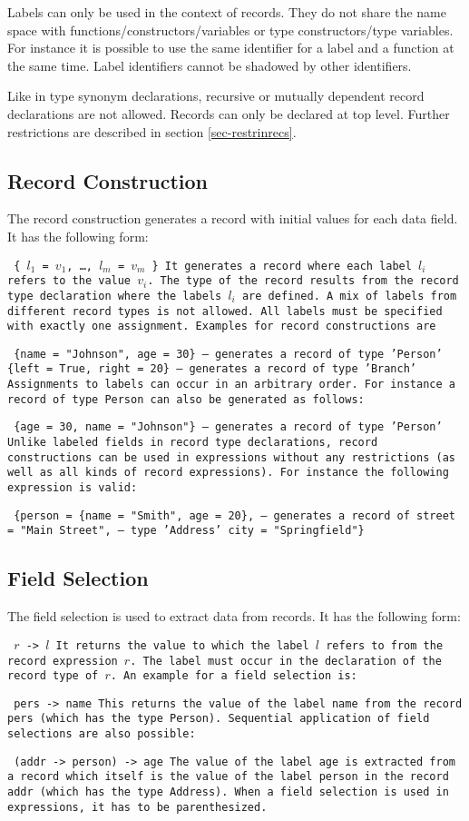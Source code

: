 \documentclass[11pt,fleqn]{article}
\makeatletter
\newenvironment{prog}{\par\vspace{1.5ex}
\setlength{\parindent}{1.0cm}
\setlength{\parskip}{-0.1ex}
\obeylines\@vobeyspaces\tt}{\vspace{1.5ex}\noindent
}
\newcommand{\startprog}{\begin{prog}}
\newcommand{\stopprog}{\end{prog}\noindent}
\newcommand{\pr}[1]{\mbox{\tt #1}}   %
\makeatother
\begin{document}
Labels can only be used in the context of
records. They do not share the name space with 
functions/constructors/variables or type constructors/type variables. 
For instance it is possible to use 
the same identifier for a label and a function at the same time. Label
identifiers cannot be shadowed by other identifiers.


Like in type synonym declarations, recursive or mutually 
dependent record declarations are not allowed. Records can only
be declared at top level. Further restrictions are described in
section \ref{sec-restrinrecs}.


\subsection{Record Construction}
\label{sec-recordconstr}

The record construction generates a record with initial values for
each data field. It has the following form:
\startprog
\{ $l_1$ = $v_1$, \ldots, $l_m$ = $v_m$ \}
\stopprog
It generates a record where each label $l_i$ refers to the
value $v_i$. The type of the record results from the record type
declaration where the labels $l_i$ are defined.
A mix of labels from different
record types is not allowed. All labels must be specified with 
exactly one assignment. Examples for record constructions are
\startprog
\{name = "Johnson", age = 30\}     -- generates a record of type 'Person'
\{left = True, right = 20\}        -- generates a record of type 'Branch'
\stopprog
Assignments to labels can occur in an arbitrary order. For instance a
record of type \pr{Person} can also be generated as follows:
\startprog
\{age = 30, name = "Johnson"\}     -- generates a record of type 'Person'
\stopprog
Unlike labeled fields in record type declarations, 
record constructions can be used in expressions without any restrictions
(as well as all kinds of record expressions). For instance the following
expression is valid:
\startprog
\{person = \{name = "Smith", age = 20\},   -- generates a record of
 street = "Main Street",                -- type 'Address'
 city   = "Springfield"\}
\stopprog


\subsection{Field Selection}
\label{sec-fieldsel}

The field selection is used to extract data from records. 
It has the following form:
\startprog
$r$ -> $l$
\stopprog
It returns the value to which the label $l$ refers to from the
record expression $r$. The label must occur in the declaration of
the record type of $r$.
An example for a field selection is:
\startprog
pers -> name
\stopprog
This returns the value of the label \pr{name} from the record \pr{pers}
(which has the type \pr{Person}).
Sequential application of field selections are also possible:
\startprog
(addr -> person) -> age
\stopprog
The value of the label \pr{age} is extracted from a record which itself
is the value of the label \pr{person} in the record \pr{addr}
(which has the type \pr{Address}). When a field selection is used in
expressions, it has to be parenthesized.
\end{document}
